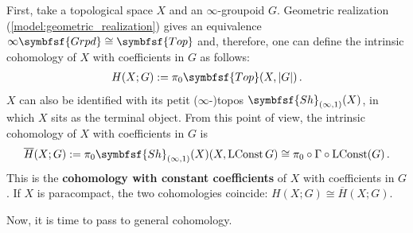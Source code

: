         First, take a topological space $X$ and an $\infty$-groupoid $G$. Geometric realization (\cref{model:geometric_realization}) gives an equivalence $\infty\symbfsf{Grpd}\cong\symbfsf{Top}$ and, therefore, one can define the intrinsic cohomology of $X$ with coefficients in $G$ as follows:
        \begin{gather}
            H(X;G) := \pi_0\symbfsf{Top}(X,|G|)\,.
        \end{gather}
        $X$ can also be identified with its petit ($\infty$-)topos $\symbfsf{Sh}_{(\infty,1)}(X)$, in which $X$ sits as the terminal object. From this point of view, the intrinsic cohomology of $X$ with coefficients in $G$ is
        \begin{gather}
            \overline{H}(X;G) := \pi_0\symbfsf{Sh}_{(\infty,1)}(X)(X,\mathrm{LConst}\,G)\cong\pi_0\circ\Gamma\circ\mathrm{LConst}(G)\,.
        \end{gather}
        This is the \textbf{cohomology with constant coefficients} of $X$ with coefficients in $G$. If $X$ is paracompact, the two cohomologies coincide: $H(X;G)\cong\overline{H}(X;G)$.
    
        Now, it is time to pass to general cohomology.
    
